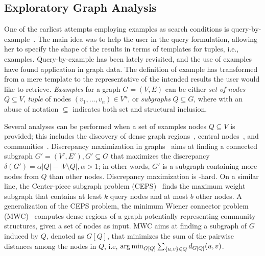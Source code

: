 \subsection{Exploratory Graph Analysis} 


\noindent One of the earliest attempts employing examples as search conditions is query-by-example~\citep{zloof1975query}.
The main idea was to help the user in the query formulation, allowing her to specify the shape of the results in terms of templates for tuples, i.e., examples.
Query-by-example has been lately revisited, and the use of examples have found application in graph data. 
The definition of example has transformed from a mere template to the representative of the intended results the user would like to retrieve.
\emph{Examples} for a graph $G = (V,E)$ can be either \emph{set of nodes} $Q \subseteq V$, \emph{tuple} of nodes $(v_1, ..., v_n) \in V^n$, or \emph{subgraphs} $Q \subseteq G$, where with an abuse of notation $\subseteq$ indicates both set and structural inclusion. 

 Several analyses can be performed when a set of examples nodes $Q\subseteq V$ is provided; this includes the discovery of dense graph regions~\citep{gionis2015bump,ruchansky2015minimum}, central nodes~\citep{tong2006center}, and communities~\citep{staudt2014detecting,perozzi2014focused}.%
Discrepancy maximization in graphs~\citep{gionis2015bump} aims at finding a connected subgraph $G' = (V', E'), G' \subseteq G$ that maximizes the discrepancy $\delta(G'){=}\alpha|Q|{-}|V{\setminus}Q|, \alpha > 1$; in other words, $G'$ is a subgraph containing more nodes from $Q$ than other nodes. 
Discrepancy maximization is \NP-hard. 
On a similar line, the Center-piece subgraph problem (CEPS)~\citep{tong2006center} finds the maximum weight subgraph that contains at least $k$ query nodes and at most $b$ other nodes. 
A generalization of the CEPS problem, the minimum Wiener connector problem (MWC)~\citep{ruchansky2015minimum} computes dense regions of a graph potentially representing community structures, given a set of nodes as input. MWC aims at finding a subgraph of $G$ induced by $Q$, denoted as $G[Q]$, that minimizes the sum of the pairwise distances among the nodes in $Q$, i.e, $\operatorname*{\arg\min}_{G[Q]}\sum_{\{u,v\}{\in}Q}{}d_{G[Q]}(u,v)$. 

